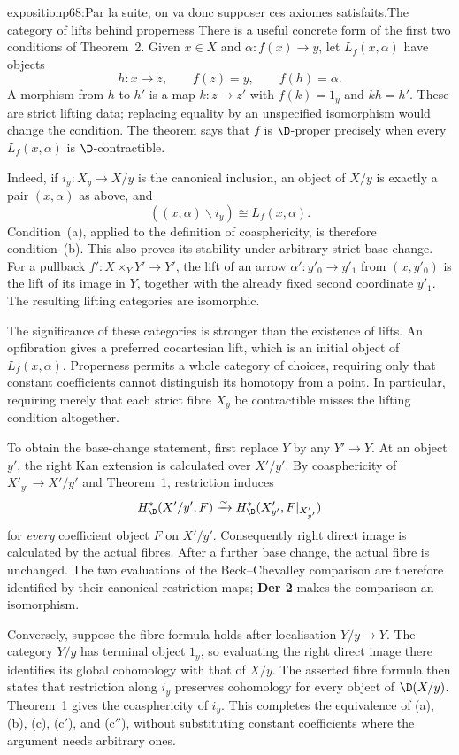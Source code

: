 \begin{dcomment}{exposition}{p68:Par la suite, on va donc supposer ces axiomes satisfaits.}{The category of lifts behind properness}
There is a useful concrete form of the first two conditions of Theorem~2. Given $x\in X$ and $\alpha:f(x)\to y$, let $L_f(x,\alpha)$ have objects
\[
 h:x\longrightarrow z,\qquad f(z)=y,\qquad f(h)=\alpha.
\]
A morphism from $h$ to $h'$ is a map $k:z\to z'$ with $f(k)=1_y$ and $kh=h'$. These are strict lifting data; replacing equality by an unspecified isomorphism would change the condition. The theorem says that $f$ is $\D$-proper precisely when every $L_f(x,\alpha)$ is $\D$-contractible.

Indeed, if $i_y:X_y\to X/y$ is the canonical inclusion, an object of $X/y$ is exactly a pair $(x,\alpha)$ as above, and
\[
 ((x,\alpha)\backslash i_y)\cong L_f(x,\alpha).
\]
Condition~(a), applied to the definition of coasphericity, is therefore condition~(b). This also proves its stability under arbitrary strict base change. For a pullback $f':X\times_Y Y'\to Y'$, the lift of an arrow $\alpha':y'_0\to y'_1$ from $(x,y'_0)$ is the lift of its image in $Y$, together with the already fixed second coordinate $y'_1$. The resulting lifting categories are isomorphic.

The significance of these categories is stronger than the existence of lifts. An opfibration gives a preferred cocartesian lift, which is an initial object of $L_f(x,\alpha)$. Properness permits a whole category of choices, requiring only that constant coefficients cannot distinguish its homotopy from a point. In particular, requiring merely that each strict fibre $X_y$ be contractible misses the lifting condition altogether.

To obtain the base-change statement, first replace $Y$ by any $Y'\to Y$. At an object $y'$, the right Kan extension is calculated over $X'/y'$. By coasphericity of $X'_{y'}\to X'/y'$ and Theorem~1, restriction induces
\[
 H^*_{\D}(X'/y',F)\xrightarrow{\sim}
 H^*_{\D}(X'_{y'},F|_{X'_{y'}})
\]
for \emph{every} coefficient object $F$ on $X'/y'$. Consequently right direct image is calculated by the actual fibres. After a further base change, the actual fibre is unchanged. The two evaluations of the Beck--Chevalley comparison are therefore identified by their canonical restriction maps; \textbf{Der 2} makes the comparison an isomorphism.

Conversely, suppose the fibre formula holds after localisation $Y/y\to Y$. The category $Y/y$ has terminal object $1_y$, so evaluating the right direct image there identifies its global cohomology with that of $X/y$. The asserted fibre formula then states that restriction along $i_y$ preserves cohomology for every object of $\D(X/y)$. Theorem~1 gives the coasphericity of $i_y$. This completes the equivalence of (a), (b), (c), (c$'$), and (c$''$), without substituting constant coefficients where the argument needs arbitrary ones.
\end{dcomment}

